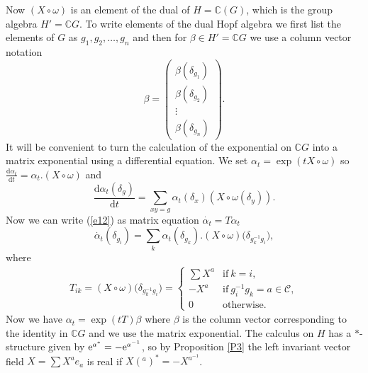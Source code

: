 \documentclass[10pt,a4paper]{amsart}
\numberwithin{equation}{section}
\newcommand{\extd}{\mathrm{d}}
\newcommand{\C}{\mathbb{C}}
\newcommand{\<}{\langle}
\renewcommand{\>}{\rangle}
\begin{document}
Now $ (X \circ \omega) $ is an element of the dual of $ H=\C(G) $, which is the group algebra $H'= \C G $. To write elements of the dual Hopf algebra we first list the elements of $ G $ as $ g_{1},g_{2}, \dots, g_{n} $ and then for $ \beta \in H' =\C G $ we use a column vector notation
\begin{equation}\label{e52}
	\beta= \left( \begin{matrix}
		\beta(\delta_{g_{1}})\\
		\beta(\delta_{g_{2}})\\
		\vdots\\
		\beta(\delta_{g_{n}})
	\end{matrix} \right).
\end{equation}
It will be convenient to turn the calculation of the exponential on $ \C G $ into a matrix exponential using a differential equation. We set $ \alpha_t =\exp (t X \circ \omega) $ so $ \frac{ \extd \alpha_t }{ \extd t}= \alpha_t. (X \circ \omega) $ and
\begin{equation}\label{e12}
\dfrac{ \extd \alpha _t(\delta_{g}) }{ \extd t}= \sum_{ xy=g} \alpha_t (\delta_x) (X \circ \omega(\delta_{y})).
\end{equation}
Now we can write (\ref{e12}) as matrix equation $ \dot{\alpha_t }=T\alpha _t $
\begin{equation}\label{e46}
\dot{\alpha_t }(\delta_{g_{i}})=\sum_{k} \alpha_t (\delta_{g_{k}}). (X \circ \omega)\big(\delta_{g_{k}^{-1} g_{i}}\big),
\end{equation}
where
\begin{gather}\label{e13}
T_{ik}= (X \circ \omega)\big(\delta_{g_{k}^{-1} g_{i}}\big)=\begin{cases}
\sum X^{a} & \mbox{if} \ k=i, \\
- X^{a} & \mbox{if}\ g_{i}^{-1} g_{k}=a \in \mathcal{C},\\
0 & \mbox{otherwise}.
\end{cases}
\end{gather}
Now we have $ \alpha_t= \exp (t T) \beta $ where $ \beta $ is the column vector corresponding to the identity in $ \C G $ and we use the matrix exponential.
The calculus on $ H $ has a $ * $-structure given by $ {\rm e}^{a^{*}}=-{\rm e}^{a^{-1}} $, so by Proposition \ref{P3} the left invariant vector field $ X=\sum X^{a} e_{a} $ is real if $ X(^{a} )^{*}=-X^{a^{-1}}$.
\end{document}
